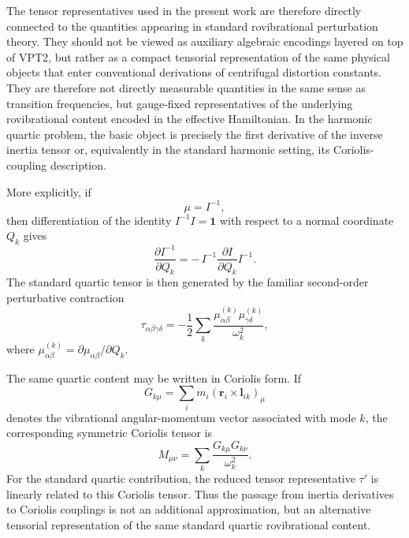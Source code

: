 \documentclass[aip,jcp,reprint,floatfix]{revtex4-2}
\begin{document}
The tensor representatives used in the present work are therefore
directly connected to the quantities appearing in standard
rovibrational perturbation theory. They should not be viewed as
auxiliary algebraic encodings layered on top of VPT2, but rather as
a compact tensorial representation of the same physical objects that
enter conventional derivations of centrifugal distortion constants.
They are therefore not directly measurable quantities in the same sense
as transition frequencies, but gauge-fixed representatives of the
underlying rovibrational content encoded in the effective Hamiltonian.
In the harmonic quartic problem, the basic object is precisely the
first derivative of the inverse inertia tensor or, equivalently in the
standard harmonic setting, its Coriolis-coupling description.

More explicitly, if
\begin{equation}
\mu = I^{-1},
\end{equation}
then differentiation of the identity $I^{-1}I=\mathbf 1$ with respect to
a normal coordinate $Q_k$ gives
\begin{equation}
\frac{\partial I^{-1}}{\partial Q_k}
=
-\,I^{-1}\frac{\partial I}{\partial Q_k}I^{-1}.
\end{equation}
The standard quartic tensor is then generated by the familiar
second-order perturbative contraction
\begin{equation}
\tau_{\alpha\beta\gamma\delta}
=
-\frac12\sum_k
\frac{
\mu_{\alpha\beta}^{(k)}\mu_{\gamma\delta}^{(k)}
}{\omega_k^2},
\end{equation}
where $\mu_{\alpha\beta}^{(k)}=\partial\mu_{\alpha\beta}/\partial Q_k$.

The same quartic content may be written in Coriolis form. If
\begin{equation}
G_{k\mu}=\sum_i m_i\left(\mathbf r_i\times \mathbf l_{ik}\right)_\mu
\end{equation}
denotes the vibrational angular-momentum vector associated with mode
$k$, the corresponding symmetric Coriolis tensor is
\begin{equation}
M_{\mu\nu}=\sum_k\frac{G_{k\mu}G_{k\nu}}{\omega_k^2}.
\end{equation}
For the standard quartic contribution, the reduced tensor
representative $\tau'$ is linearly related to this Coriolis tensor.
Thus the passage from inertia derivatives to Coriolis couplings is not
an additional approximation, but an alternative tensorial
representation of the same standard quartic rovibrational content.
\end{document}
